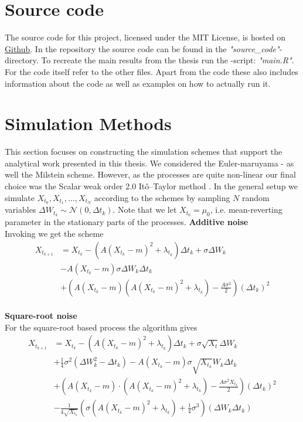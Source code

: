 \section{Source code}
The source code for this project, licensed under the MIT License, is hosted on \href{https://github.com/Gantzhorn/Thesis}{Github}. In the repository the source code can be found in the \textit{"source\_code"}-directory. To recreate the main results from the thesis run the -script: \textit{"main.R"}. For the code itself refer to the other files. Apart from the code these also includes information about the code as well as examples on how to actually run it. 
\section{Simulation Methods}\label{appendix:simMethods}
This section focuses on constructing the simulation schemes that support the analytical work presented in this thesis. We considered the Euler-maruyama - as well the Milstein scheme. However, as the processes are quite non-linear our final choice was the Scalar weak order 2.0 Itô–Taylor method \cite[algorithm 8.5]{Srkk2019}. In the general setup we simulate $X_{t_0},X_{t_1},\dots, X_{t_N}$ according to the schemes by sampling $N$ random variables $\Delta W_{t_k}\sim\mathcal{N}\left(0, \Delta t_k\right)$. Note that we let $X_{t_0} = \mu_0$, i.e. mean-reverting parameter in the stationary parts of the processes.
\noindent \textbf{Additive noise}\\
Invoking \cite[algorithm 8.5]{Srkk2019} we get the scheme
\begin{align}
    X_{t_{k + 1}} &= X_{t_k} - \left(A(X_{t_k} - m)^2 + \lambda_{t_k}\right) \Delta t_k + \sigma \Delta W_{k} \nonumber \\&-  A \left(X_{t_k} - m\right)\sigma \Delta W_k \Delta t_k\nonumber \\
    & + \left(A\left(X_{t_k} - m\right)\left(A\left(X_{t_k} - m\right)^2 + \lambda_{t_k}\right) - \frac{A \sigma^2}{2}\right)\left(\Delta t_k\right)^2 \label{eq:OUSim}
\end{align}
\\
\textbf{Square-root noise}\\
For the square-root based process the algorithm gives 
\begin{align}
    X_{t_{k + 1}} &= X_{t_k} - \left(A(X_{t_k} - m)^2 + \lambda_{t_k}\right) \Delta t_k + \sigma \sqrt{X_t} \Delta W_{k}\nonumber\\ &+ \frac{1}{4}\sigma^2 \left(\Delta W_k^2 - \Delta t_k\right)     - A\left(X_{t_k} - m\right)\sigma \sqrt{X_{t_k}} W_k \Delta t_k
    \nonumber\\
     &+ \left(A\left(X_{t_k} - m\right)\cdot \left(A\left(X_{t_k} - m\right)^2 + \lambda_{t_k}\right) - \frac{A\sigma^2 X_{t_k}}{2}\right)(\Delta t_k)^2 \nonumber\\
    &- \frac{1}{4\sqrt{X_{t_k}}}\left(\sigma\left(A\left(X_{t_k} - m\right)^2 + \lambda_{t_k}\right) + \frac{1}{4}\sigma^3\right) \left(\Delta W_k \Delta t_k\right)
\end{align}
